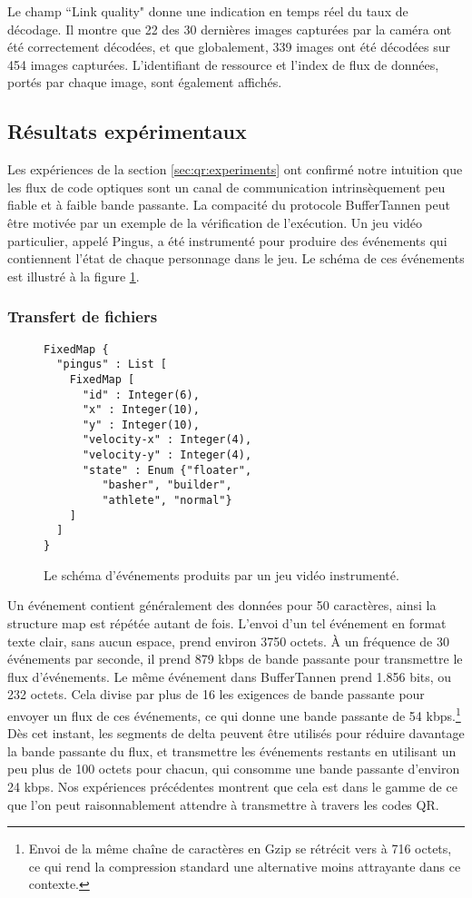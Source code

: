 Le champ ``Link quality" donne une indication en temps réel du taux de décodage. Il montre que 22 des 30 dernières images capturées par la caméra ont été correctement décodées, et que globalement, 339 images ont été décodées sur 454 images capturées. L'identifiant de ressource et l'index de flux de données, portés par chaque image, sont également affichés.

\subsection{Résultats expérimentaux}
\setcounter{paragraph}{0}

Les expériences de la section \ref{sec:qr:experiments} ont confirmé notre intuition que les flux de code optiques sont un canal de communication intrinsèquement peu fiable et à faible bande passante. La compacité du protocole BufferTannen peut être motivée par un exemple de la vérification de l'exécution. Un jeu vidéo particulier, appelé Pingus, a été instrumenté pour produire des événements qui contiennent l'état de chaque personnage dans le jeu. Le schéma de ces événements est illustré à la figure \ref{fig:qr:pingus-schema}.

\subsubsection{Transfert de fichiers}

\begin{figure}
\centering
\begin{verbatim}
FixedMap {
  "pingus" : List [
    FixedMap [
      "id" : Integer(6),
      "x" : Integer(10),
      "y" : Integer(10),
      "velocity-x" : Integer(4),
      "velocity-y" : Integer(4),
      "state" : Enum {"floater",
         "basher", "builder",
         "athlete", "normal"}
    ]
  ]
}
\end{verbatim}
\caption{Le schéma d'événements produits par un jeu vidéo instrumenté.}
\label{fig:qr:pingus-schema}
\end{figure}

Un événement contient généralement des données pour 50 caractères, ainsi la structure map est répétée autant de fois. L'envoi d'un tel événement en format texte clair, sans aucun espace, prend environ 3750 octets. À un fréquence de 30 événements par seconde, il prend 879 kbps de bande passante pour transmettre le flux d'événements. Le même événement dans BufferTannen prend 1.856 bits, ou 232 octets. Cela divise par plus de 16 les exigences de bande passante pour envoyer un flux de ces événements, ce qui donne une bande passante de 54 kbps.\footnote{Envoi de la même chaîne de caractères en Gzip se rétrécit vers à 716 octets, ce qui rend la compression standard une alternative moins attrayante dans ce contexte.} Dès cet instant, les segments de delta peuvent être utilisés pour réduire davantage la bande passante du flux, et transmettre les événements restants en utilisant un peu plus de 100 octets pour chacun, qui consomme une bande passante d'environ 24 kbps. Nos expériences précédentes montrent que cela est dans le gamme de ce que l'on peut raisonnablement attendre à transmettre à travers les codes QR.

